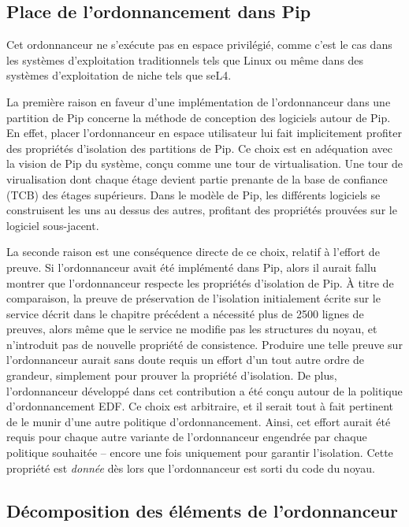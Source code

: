 		\subsection{Place de l'ordonnancement dans Pip}

		Cet ordonnanceur ne s'exécute pas en espace privilégié, comme c'est le cas dans les systèmes d'exploitation traditionnels tels que Linux ou même dans des systèmes d'exploitation de niche tels que seL4. 

		La première raison en faveur d'une implémentation de l'ordonnanceur dans une partition de Pip concerne la méthode de conception des logiciels autour de Pip. En effet, placer l'ordonnanceur en espace utilisateur lui fait implicitement profiter des propriétés d'isolation des partitions de Pip. Ce choix est en adéquation avec la vision de Pip du système, conçu comme une tour de virtualisation. Une tour de virualisation dont chaque étage devient partie prenante de la base de confiance (TCB) des étages supérieurs. Dans le modèle de Pip, les différents logiciels se construisent les uns au dessus des autres, profitant des propriétés prouvées sur le logiciel sous-jacent.

		La seconde raison est une conséquence directe de ce choix, relatif à l'effort de preuve. Si l'ordonnanceur avait été implémenté dans Pip, alors il aurait fallu montrer que l'ordonnanceur respecte les propriétés d'isolation de Pip. À titre de comparaison, la preuve de préservation de l'isolation initialement écrite sur le service décrit dans le chapitre précédent a nécessité plus de 2500 lignes de preuves, alors même que le service ne modifie pas les structures du noyau, et n'introduit pas de nouvelle propriété de consistence. Produire une telle preuve sur l'ordonnanceur aurait sans doute requis un effort d'un tout autre ordre de grandeur, simplement pour prouver la propriété d'isolation. De plus, l'ordonnanceur développé dans cet contribution a été conçu autour de la politique d'ordonnancement EDF. Ce choix est arbitraire, et il serait tout à fait pertinent de le munir d'une autre politique d'ordonnancement. Ainsi, cet effort aurait été requis pour chaque autre variante de l'ordonnanceur engendrée par chaque politique souhaitée -- encore une fois uniquement pour garantir l'isolation. Cette propriété est \emph{donnée} dès lors que l'ordonnanceur est sorti du code du noyau.

		\subsection{Décomposition des éléments de l'ordonnanceur}
		\label{sec:project_overview}

